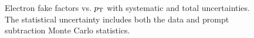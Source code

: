 \begin{figure}[h] 
  \centering
  \caption{Electron fake factors vs. $p_{\text{T}}$ with systematic and total uncertainties. The statistical uncertainty includes both the data and prompt subtraction Monte Carlo statistics.}
  \label{fig:electron-fake-factor-uncertainties}
\end{figure}

\clearpage

